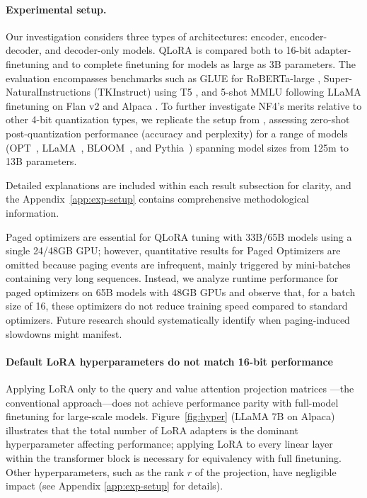 \paragraph{Experimental setup.} Our investigation considers three types of architectures: encoder, encoder-decoder, and decoder-only models. QLoRA is compared both to 16-bit adapter-finetuning and to complete finetuning for models as large as 3B parameters. The evaluation encompasses benchmarks such as GLUE \citep{wang2018glue} for RoBERTa-large \citep{liu2019roberta}, Super-NaturalInstructions (TKInstruct) \citep{wang2022super} using T5 \citep{t5}, and 5-shot MMLU \citep{hendrycksmeasuring} following LLaMA finetuning on Flan v2 \citep{longpre2023flan} and Alpaca \citep{alpaca}. To further investigate NF4’s merits relative to other 4-bit quantization types, we replicate the setup from \citet{dettmers2022case}, assessing zero-shot post-quantization performance (accuracy and perplexity) for a range of models (OPT~\citep{zhang2022opt}, LLaMA~\citep{touvron2023llama}, BLOOM~\citep{scao2022bloom}, and Pythia~\citep{biderman2023pythia}) spanning model sizes from 125m to 13B parameters.

Detailed explanations are included within each result subsection for clarity, and the Appendix~\ref{app:exp-setup} contains comprehensive methodological information.

Paged optimizers are essential for \textsc{QLoRA} tuning with 33B/65B models using a single 24/48GB GPU; however, quantitative results for Paged Optimizers are omitted because paging events are infrequent, mainly triggered by mini-batches containing very long sequences. Instead, we analyze runtime performance for paged optimizers on 65B models with 48GB GPUs and observe that, for a batch size of 16, these optimizers do not reduce training speed compared to standard optimizers. Future research should systematically identify when paging-induced slowdowns might manifest.

\paragraph{Default LoRA hyperparameters do not match 16-bit performance} 

Applying LoRA only to the query and value attention projection matrices \citep{hu2021lora}—the conventional approach—does not achieve performance parity with full-model finetuning for large-scale models. Figure~\ref{fig:hyper} (LLaMA 7B on Alpaca) illustrates that the total number of LoRA adapters is the dominant hyperparameter affecting performance; applying LoRA to every linear layer within the transformer block is necessary for equivalency with full finetuning. Other hyperparameters, such as the rank $r$ of the projection, have negligible impact (see Appendix \ref{app:exp-setup} for details).

